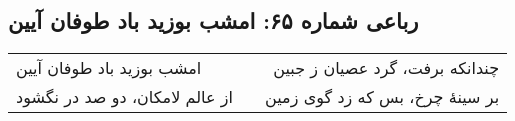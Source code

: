 \begin{center}
\section*{رباعی شماره ۶۵: امشب بوزید باد طوفان آیین}
\label{sec:065}
\begin{longtable}{l p{0.5cm} r}
امشب بوزید باد طوفان آیین
&&
چندانکه برفت، گرد عصیان ز جبین
\\
از عالم لامکان، دو صد در نگشود
&&
بر سینهٔ چرخ، بس که زد گوی زمین
\\
\end{longtable}
\end{center}
